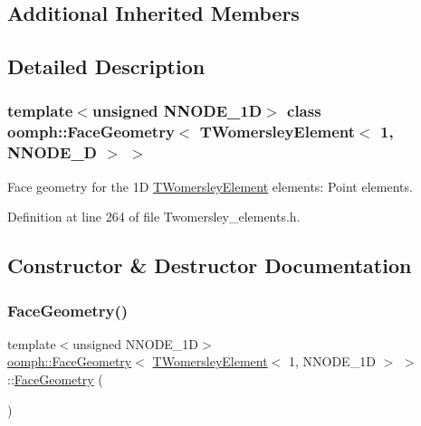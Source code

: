 \subsection*{Additional Inherited Members}


\subsection{Detailed Description}
\subsubsection*{template$<$unsigned N\+N\+O\+D\+E\+\_\+1D$>$\newline
class oomph\+::\+Face\+Geometry$<$ T\+Womersley\+Element$<$ 1, N\+N\+O\+D\+E\+\_\+D $>$ $>$}

Face geometry for the 1D \hyperlink{classoomph_1_1TWomersleyElement}{T\+Womersley\+Element} elements\+: Point elements. 

Definition at line 264 of file Twomersley\+\_\+elements.\+h.



\subsection{Constructor \& Destructor Documentation}
\mbox{\label{classoomph_1_1FaceGeometry_3_01TWomersleyElement_3_011_00_01NNODE__1D_01_4_01_4_a6db1b1f549675de60e0847709a2b925a}} 
\subsubsection{\texorpdfstring{Face\+Geometry()}{FaceGeometry()}}
{\footnotesize\ttfamily template$<$unsigned N\+N\+O\+D\+E\+\_\+1D$>$ \\
\hyperlink{classoomph_1_1FaceGeometry}{oomph\+::\+Face\+Geometry}$<$ \hyperlink{classoomph_1_1TWomersleyElement}{T\+Womersley\+Element}$<$ 1, N\+N\+O\+D\+E\+\_\+1D $>$ $>$\+::\hyperlink{classoomph_1_1FaceGeometry}{Face\+Geometry} (\begin{DoxyParamCaption}{ }\end{DoxyParamCaption})\hspace{0.3cm}{\ttfamily [inline]}}



